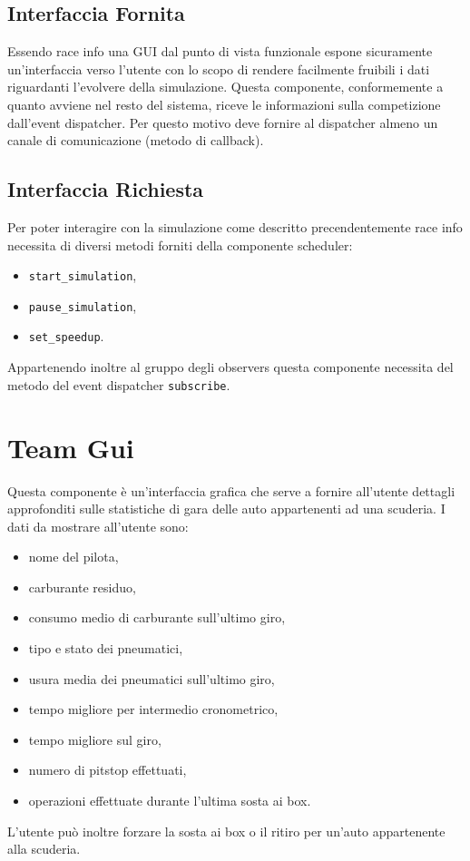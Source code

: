 \documentclass[11pt,a4paper]{report}
\newcommand{\fun}[1]{\texttt{#1}}
\begin{document}
\subsection*{Interfaccia Fornita}
Essendo race info una GUI dal punto di vista funzionale espone sicuramente un'interfaccia verso l'utente con lo scopo di rendere facilmente fruibili i dati riguardanti l'evolvere della simulazione.
Questa componente, conformemente a quanto avviene nel resto del sistema, riceve le informazioni sulla competizione dall'event dispatcher. Per questo motivo deve fornire al dispatcher almeno un canale di comunicazione (metodo di callback).
\subsection*{Interfaccia Richiesta}
Per poter interagire con la simulazione come descritto precendentemente race info necessita di diversi metodi forniti della componente scheduler:
\begin{itemize}
\item \fun{start\_simulation},
\item \fun{pause\_simulation},
\item \fun{set\_speedup}.
\end{itemize}
Appartenendo inoltre al gruppo degli observers questa componente necessita del metodo del event dispatcher \fun{subscribe}.
\section{Team Gui}
Questa componente è un'interfaccia grafica che serve a fornire all'utente dettagli approfonditi sulle statistiche di gara delle auto appartenenti ad una scuderia.
I dati da mostrare all'utente sono:
\begin{itemize}
\item nome del pilota,
\item carburante residuo,
\item consumo medio di carburante sull'ultimo giro,
\item tipo e stato dei pneumatici,
\item usura media dei pneumatici sull'ultimo giro,
\item tempo migliore per intermedio cronometrico,
\item tempo migliore sul giro,
\item numero di pitstop effettuati,
\item operazioni effettuate durante l'ultima sosta ai box.
\end{itemize}
L'utente può inoltre forzare la sosta ai box o il ritiro per un'auto appartenente alla scuderia.
\end{document}
